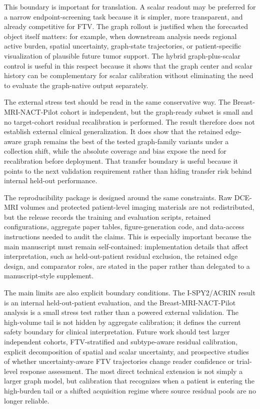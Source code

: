 \documentclass[journal,twoside,print]{ieeecolor}
\begin{document}
This boundary is important for translation. A scalar readout may be preferred
for a narrow endpoint-screening task because it is simpler, more transparent,
and already competitive for FTV. The graph rollout is justified when the
forecasted object itself matters: for example, when downstream analysis needs
regional active burden, spatial uncertainty, graph-state trajectories, or
patient-specific visualization of plausible future tumor support. The hybrid
graph-plus-scalar control is useful in this respect because it shows that the
graph center and scalar history can be complementary for scalar calibration
without eliminating the need to evaluate the graph-native output separately.

The external stress test should be read in the same conservative way. The
Breast-MRI-NACT-Pilot cohort is independent, but the graph-ready subset is small
and no target-cohort residual recalibration is performed. The result therefore
does not establish external clinical generalization. It does show that the
retained edge-aware graph remains the best of the tested graph-family variants
under a collection shift, while the absolute coverage and bias expose the need
for recalibration before deployment. That transfer boundary is useful because
it points to the next validation requirement rather than hiding transfer risk
behind internal held-out performance.

The reproducibility package is designed around the same constraints. Raw
DCE-MRI volumes and protected patient-level imaging materials are not
redistributed, but the release records the training and evaluation scripts,
retained configurations, aggregate paper tables, figure-generation code, and
data-access instructions needed to audit the claims. This is especially
important because the main manuscript must remain self-contained: implementation
details that affect interpretation, such as held-out-patient residual exclusion,
the retained edge design, and comparator roles, are stated in the paper rather
than delegated to a manuscript-style supplement.

The main limits are also explicit boundary conditions. The I-SPY2/ACRIN result
is an internal held-out-patient evaluation, and the Breast-MRI-NACT-Pilot
analysis is a small stress test rather than a powered external validation. The
high-volume tail is not hidden by aggregate calibration; it defines the current
safety boundary for clinical interpretation. Future work should test larger
independent cohorts, FTV-stratified and subtype-aware residual calibration,
explicit decomposition of spatial and scalar uncertainty, and prospective
studies of whether uncertainty-aware FTV trajectories change reader confidence
or trial-level response assessment. The most direct technical extension is not
simply a larger graph model, but calibration that recognizes when a patient is
entering the high-burden tail or a shifted acquisition regime where source
residual pools are no longer reliable.
\end{document}
